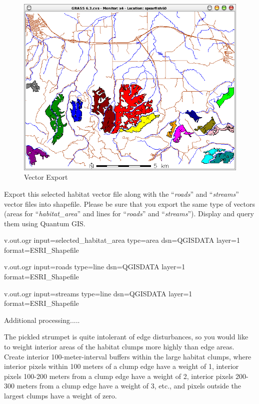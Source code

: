 \begin{figure}[htbp]
   \centering
   \includegraphics[scale=0.35]{grass024.png}
   \caption{Vector Export}
   \label{fig:grass024}
\end{figure}

Export this selected habitat vector file along with the ``\textit{roads}'' and ``\textit{streams}'' vector files into shapefile. Please be sure that you export the same type of vectors (areas for ``\textit{habitat\_area}'' and lines for ``\textit{roads}'' and ``\textit{streams}''). Display and query them using Quantum GIS.

\begin{smallverbatim}
v.out.ogr input=selected_habitat_area type=area
 dsn=QGISDATA layer=1 format=ESRI_Shapefile

v.out.ogr input=roads type=line dsn=QGISDATA
 layer=1 format=ESRI_Shapefile

v.out.ogr input=streams type=line dsn=QGISDATA
 layer=1 format=ESRI_Shapefile
\end{smallverbatim}

Additional processing.....

The pickled strumpet is quite intolerant of edge disturbances, so you would like to weight interior areas of the habitat clumps more highly than edge areas. Create interior 100-meter-interval buffers within the large habitat clumps, where interior pixels within 100 meters of a clump edge have a weight of 1, interior pixels 100-200 meters from a clump edge have a weight of 2, interior pixels 200-300 meters from a clump edge have a weight of 3, etc., and pixels outside the largest clumps have a weight of zero.


